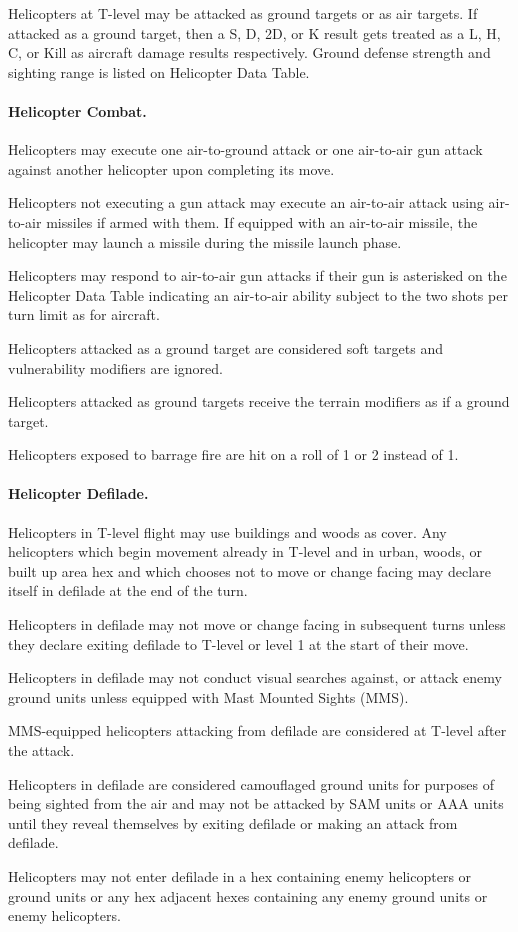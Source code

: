 {Helicopters at T-level may be attacked as ground targets or as air targets.  If attacked as a ground target, then a S, D, 2D, or K result gets treated as a L, H, C, or Kill as aircraft damage results respectively.  Ground defense strength and sighting range is listed on Helicopter Data Table.

\paragraph{Helicopter Combat.}

Helicopters may execute one air-to-ground attack or one air-to-air gun attack against another helicopter upon completing its move.

Helicopters not executing a gun attack may execute an air-to-air attack using air-to-air missiles if armed with them.  If equipped with an air-to-air missile, the helicopter may launch a missile during the missile launch phase.

Helicopters may respond to air-to-air gun attacks if their gun is asterisked on the Helicopter Data Table indicating an air-to-air ability subject to the two shots per turn limit as for aircraft.

Helicopters attacked as a ground target are considered soft targets and vulnerability modifiers are ignored.

Helicopters attacked as ground targets receive the terrain modifiers as if a ground target.

Helicopters exposed to barrage fire are hit on a roll of 1 or 2 instead of 1.

\paragraph{Helicopter Defilade.}

Helicopters in T-level flight may use buildings and woods as cover.  Any helicopters which begin movement already in T-level and in urban, woods, or built up area hex and which chooses not to move or change facing may declare itself in defilade at the end of the turn.

Helicopters in defilade may not move or change facing in subsequent turns unless they declare exiting defilade to T-level or level 1 at the start of their move. 

Helicopters in defilade may not conduct visual searches against, or attack enemy ground units unless equipped with Mast Mounted Sights (MMS).

MMS-equipped helicopters attacking from defilade are considered at T-level after the attack.

Helicopters in defilade are considered camouflaged ground units for purposes of being sighted from the air and may not be attacked by SAM units or AAA units until they reveal themselves by exiting defilade or making an attack from defilade.

Helicopters may not enter defilade in a hex containing enemy helicopters or ground units or any hex adjacent hexes containing any enemy ground units or enemy helicopters. 

}
